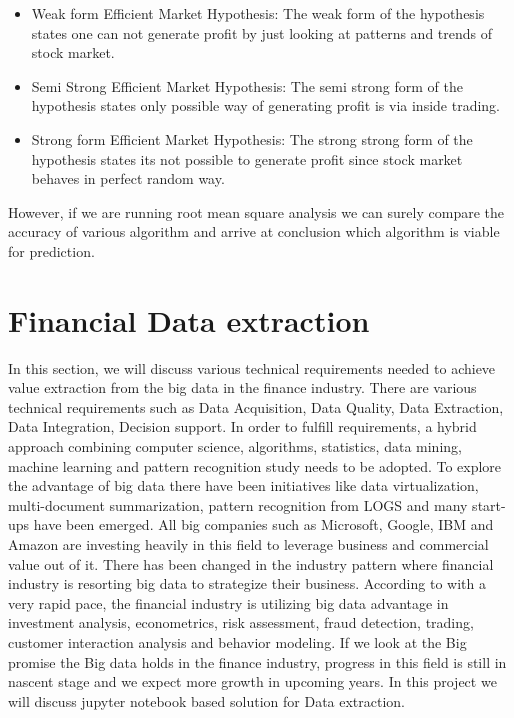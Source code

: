 \begin{itemize}

\item Weak form Efficient Market Hypothesis: The weak form of the hypothesis states one can not generate profit by just looking at patterns and trends of stock market.  
\item Semi Strong Efficient Market Hypothesis: The semi strong form of the hypothesis states only possible way of generating profit is via inside trading. 
\item Strong form Efficient Market Hypothesis: The strong strong form of the hypothesis states its not possible to generate profit since stock market behaves in perfect random way. 
\end{itemize}
 
 
However, if we are running root mean square analysis we can surely compare the accuracy of various algorithm and arrive at conclusion which algorithm 
is viable for prediction.


\section{Financial Data extraction}

In this section, we will discuss various technical requirements needed to achieve value extraction from the big data in the finance industry. 
There are various technical requirements such as Data Acquisition, Data Quality, Data Extraction, Data Integration, Decision support. 
In order to fulfill requirements, a hybrid approach combining computer science, algorithms, statistics, data mining, machine learning and pattern recognition 
study needs to be adopted. To explore the advantage of big data there have been initiatives like data virtualization, multi-document summarization, 
pattern recognition from LOGS and many start-ups have been emerged.  All big companies such as Microsoft, Google, IBM and Amazon are investing heavily in this 
field to leverage business and commercial value out of it. There has been changed in the industry pattern where financial industry is resorting big data to 
strategize their business. According to \cite{Ref3}  with a very rapid pace, the financial industry is utilizing big data advantage in investment analysis,
econometrics, risk assessment, fraud detection, trading, customer interaction analysis and behavior modeling. If we look at the Big promise the Big data holds 
in the finance industry, progress in this field is still in nascent stage and we expect more growth in upcoming years.  In this project we will discuss jupyter 
notebook based solution for Data extraction. 

